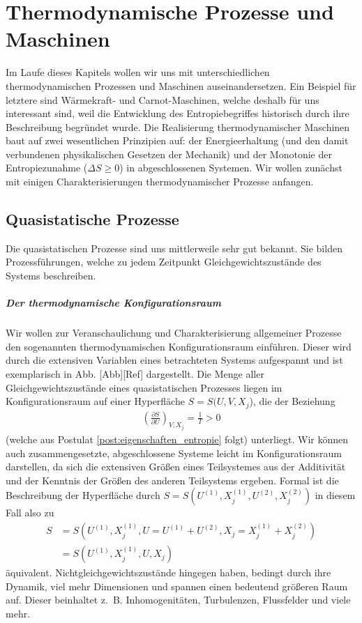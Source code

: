 
\chapter{Thermodynamische Prozesse und Maschinen}
Im Laufe dieses Kapitels wollen wir uns mit unterschiedlichen thermodynamischen Prozessen und Maschinen auseinandersetzen. Ein Beispiel für letztere sind Wärmekraft- und Carnot-Maschinen, welche deshalb für uns interessant sind, weil die Entwicklung des Entropiebegriffes historisch durch ihre Beschreibung begründet wurde.
Die Realisierung thermodynamischer Maschinen baut auf zwei wesentlichen Prinzipien auf: der Energieerhaltung (und den damit verbundenen physikalischen Gesetzen der Mechanik) und der Monotonie der Entropiezunahme ($\Delta S \geq 0$) in abgeschlossenen Systemen.
Wir wollen zunächst mit einigen Charakterisierungen thermodynamischer Prozesse anfangen.


\section{Quasistatische Prozesse}
Die quasistatischen Prozesse sind uns mittlerweile sehr gut bekannt. Sie bilden Prozessführungen, welche zu jedem Zeitpunkt Gleichgewichtszustände des Systems beschreiben.
\paragraph*{Der thermodynamische Konfigurationsraum}
Wir wollen zur Veranschaulichung und Charakterisierung allgemeiner Prozesse den sogenannten thermodynamischen Konfigurationsraum einführen. Dieser wird durch die extensiven Variablen eines betrachteten Systems aufgespannt und ist exemplarisch in Abb. [Abb][Ref] dargestellt.
Die Menge aller Gleichgewichtszustände eines quasistatischen Prozesses liegen im Konfigurationsraum auf einer Hyperfläche $S=S(U,V,X_j$), die der Beziehung 
\begin{align*}
    \left(\frac{\partial S}{\partial U}\right)_{V,X_j}=\frac{1}{T}>0
\end{align*}
(welche aus Postulat \ref{post:eigenschaften_entropie} folgt) unterliegt.  
Wir können auch zusammengesetzte, abgeschlossene Systeme leicht im Konfigurationsraum darstellen, da sich die extensiven Größen eines Teilsystemes aus der Additivität und der Kenntnis der Größen des anderen Teilsystems ergeben. Formal ist die Beschreibung der Hyperfläche durch $S=S(U^{(1)},X_j^{(1)},U^{(2)},X_j^{(2)})$ in diesem Fall also zu 
\begin{align*}
    S&=S(U^{(1)},X_j^{(1)},U=U^{(1)}+U^{(2)},X_j=X_j^{(1)}+X_j^{(2)})\\
    &=S(U^{(1)},X_j^{(1)},U,X_j)
\end{align*}
äquivalent.
Nichtgleichgewichtszustände hingegen haben, bedingt durch ihre Dynamik, viel mehr Dimensionen und spannen einen bedeutend größeren Raum auf. Dieser beinhaltet z.~B. Inhomogenitäten, Turbulenzen, Flussfelder und viele mehr. 

